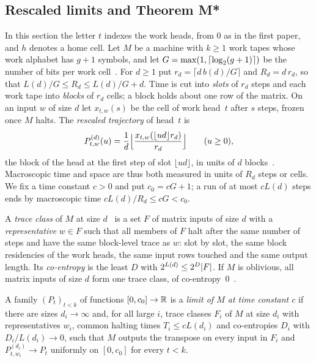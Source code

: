 \subsection{Rescaled limits and Theorem M*}\label{sec:mot-setting}

In this section the letter $t$ indexes the work heads, from $0$ as in the first paper, and $h$ denotes a home cell.
Let $M$ be a machine with $k\ge1$ work tapes whose work alphabet has $g+1$ symbols, and let $G=\max(1,\lceil \log_2 (g+1) \rceil)$
be the number of bits per work cell~\cite[Definition~6.7]{FirstPaper2026}. For $d\ge1$ put $r_d=\lceil d\,b(d)/G\rceil$
and $R_d=d\,r_d$, so that $L(d)/G\le R_d\le L(d)/G+d$. Time is cut into \emph{slots} of $r_d$ steps and each work tape
into \emph{blocks} of $r_d$ cells; a block holds about one row of the matrix. On an input $w$ of size $d$ let
$x_{t,w}(s)$ be the cell of work head~$t$ after $s$ steps, frozen once $M$ halts. The \emph{rescaled trajectory} of
head~$t$ is
\[
  P^{(d)}_{t,w}(u)=\frac1d\Bigl\lfloor\frac{x_{t,w}(\lfloor ud\rfloor r_d)}{r_d}\Bigr\rfloor\qquad(u\ge0),
\]
the block of the head at the first step of slot $\lfloor ud\rfloor$, in units of $d$ blocks~\cite[Section~7]{FirstPaper2026}.
Macroscopic time and space are thus both measured in units of $R_d$ steps or cells. We fix a time constant $c>0$ and
put $c_0=cG+1$; a run of at most $cL(d)$ steps ends by macroscopic time $cL(d)/R_d\le cG<c_0$.

A \emph{trace class} of $M$ at size $d$~\cite[Definition~6.1]{FirstPaper2026} is a set $F$ of matrix inputs of size $d$
with a \emph{representative} $w\in F$ such that all members of $F$ halt after the same number of steps and have the
same block-level trace as $w$: slot by slot, the same block residencies of the work heads, the same input rows touched
and the same output length. Its \emph{co-entropy} is the least $D$ with $2^{L(d)}\le2^D\lvert F \rvert$. If $M$ is oblivious,
all matrix inputs of size $d$ form one trace class, of co-entropy~$0$~\cite[Lemma~6.2]{FirstPaper2026}.

\begin{definition}\label{def:mot-limit}
A family $(P_t)_{t<k}$ of functions $[0,c_0]\to\mathbb{R}$ is a \emph{limit of $M$ at time constant $c$} if there are sizes
$d_i\to\infty$ and, for all large $i$, trace classes $F_i$ of $M$ at size $d_i$ with representatives $w_i$, common
halting times $T_i\le cL(d_i)$ and co-entropies $D_i$ with $D_i/L(d_i)\to0$, such that $M$ outputs the transpose on
every input in $F_i$ and $P^{(d_i)}_{t,w_i}\to P_t$ uniformly on $[0,c_0]$ for every $t<k$.
\end{definition}

